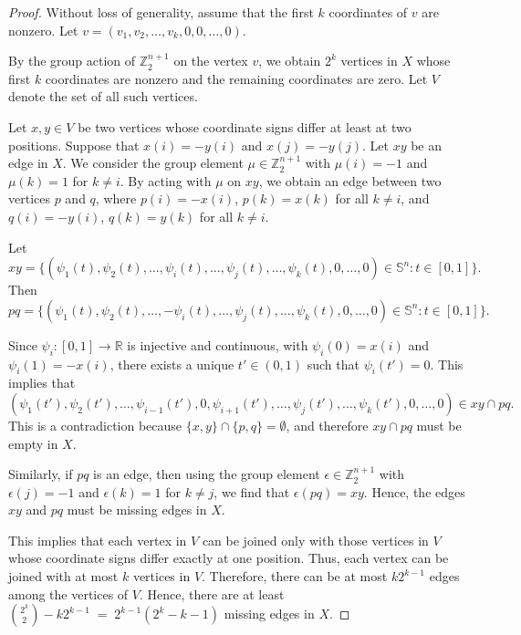 \documentclass[11pt]{amsart}
\numberwithin{equation}{section}
\theoremstyle{definition}
\newcommand{\Sp}{\mathbb{S}}
\def \bb{\mathbb}
\def \RR{{\bb{R}}}
\def \ZZ{{\bb{Z}}}
\begin{document}
\begin{proof}


Without loss of generality, assume that the first $k$ coordinates of $v$ are nonzero. Let  $v = (v_1,v_2,\ldots,v_k,0,0,\ldots,0)$.  

By the group action of $\ZZ_2^{n+1}$ on the vertex $v$, we obtain $2^k$ vertices in $X$ whose first $k$ coordinates are nonzero and the remaining coordinates are zero. Let $V$ denote the set of all such vertices.  

Let $x,y \in V$ be two vertices whose coordinate signs differ at least at two positions. Suppose that $x(i)=-y(i)$ and $x(j)=-y(j)$. Let $xy$ be an edge in $X$. We consider the group element $\mu\in\ZZ_2^{n+1}$ with $\mu(i)=-1$ and $\mu(k)=1$ for $k\neq i$. By acting with $\mu$ on $xy$, we obtain an edge between two vertices $p$ and $q$, where  
$p(i)=-x(i)$, $p(k)=x(k)$ for all $k\neq i$, and $q(i)=-y(i)$, $q(k)=y(k)$ for all $k\neq i$.  

Let  
$$
xy = \{(\psi_1(t),\psi_2(t),\ldots, \psi_{i}(t),\ldots, \psi_{j}(t),\ldots, \psi_{k}(t),0,\ldots,0)\in \Sp^n : t\in[0,1]\}.
$$  
Then  
$$
pq = \{(\psi_1(t),\psi_2(t),\ldots, -\psi_{i}(t),\ldots, \psi_{j}(t),\ldots, \psi_{k}(t),0,\ldots,0)\in \Sp^n : t\in[0,1]\}.
$$  

Since $\psi_{i}:[0,1]\rightarrow \RR$ is injective and continuous, with $\psi_{i}(0)=x(i)$ and $\psi_{i}(1)=-x(i)$, there exists a unique $t'\in (0,1)$ such that $\psi_i(t')=0$. This implies that  
$$(\psi_1(t'),\psi_2(t'),\ldots, \psi_{i-1}(t'),0,\psi_{i+1}(t'),\ldots, \psi_{j}(t'),\ldots, \psi_{k}(t'),0,\ldots,0)\in xy\cap pq.$$  
This is a contradiction because $\{x,y\}\cap\{p,q\}=\emptyset$, and therefore $xy\cap pq$ must be empty in $X$.  

Similarly, if $pq$ is an edge, then using the group element $\epsilon\in \ZZ_2^{n+1}$ with $\epsilon(j)=-1$ and $\epsilon(k)=1$ for $k\neq j$, we find that $\epsilon(pq)=xy$. Hence, the edges $xy$ and $pq$ must be missing edges in $X$.  

This implies that each vertex in $V$ can be joined only with those vertices in $V$ whose coordinate signs differ exactly at one position. Thus, each vertex can be joined with at most $k$ vertices in $V$. Therefore, there can be at most $k2^{k-1}$ edges among the vertices of $V$. Hence, there are at least  
$\binom{2^k}{2}-k2^{k-1} \;=\; 2^{k-1}(2^k-k-1)$  missing edges in $X$.
\end{proof}
\end{document}
